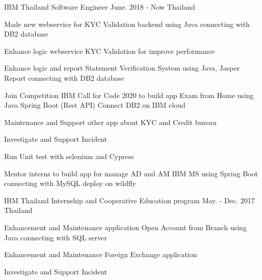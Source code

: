 

\begin{cventries}

  \cventry
    {IBM Thailand} %
    {Software Engineer} %
    {June. 2018 - Now} %
    {Thailand} %
    {
      \begin{cvitems} %
        \item {Made new webservice for KYC Validation backend using Java connecting with DB2 database}
        \item {Enhance logic webservice KYC Validation for improve performance}
        \item {Enhance logic and report Statement Verification System using Java, Jasper Report connecting with DB2 database}
        \item {Join Competition IBM Call for Code 2020 to build app Exam from Home using Java Spring Boot (Rest API) Connect DB2 on IBM cloud}
        \item {Maintenance and Support other app about KYC and Credit bureau}
        \item {Investigate and Support Incident}
        \item {Run Unit test with selenium and Cypress}
        \item {Mentor interns to build app for manage AD and AM IBM MS using Spring Boot connecting with MySQL deploy on wildfly}
      \end{cvitems}
    }

 \cventry
    {IBM Thailand} %
    {Internship and Cooperative Education program} %
    {May. - Dec. 2017} %
    {Thailand} %
    {
      \begin{cvitems} %
        \item {Enhancement and Maintenance application Open Account from Branch using Java connecting with SQL server}
        \item {Enhancement and Maintenance Foreign Exchange application}
        \item {Investigate and Support Incident}
      \end{cvitems}
    }

\end{cventries}

